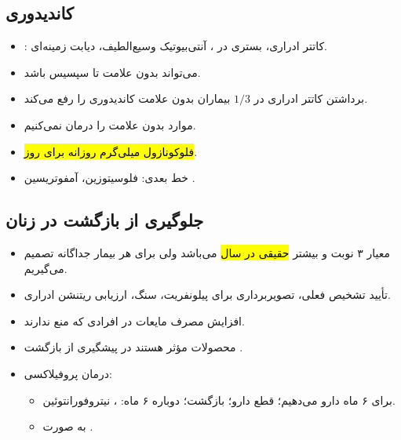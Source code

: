 \subsection*{کاندیدوری}
\begin{itemize}
\item {}: کاتتر ادراری، بستری در ، آنتی‌بیوتیک وسیع‌الطیف، دیابت زمینه‌ای.
\item می‌تواند بدون علامت تا سپسیس باشد.
\item برداشتن کاتتر ادراری در $1/3$ بیماران بدون علامت کاندیدوری را رفع می‌کند.
\item موارد بدون علامت را درمان نمی‌کنیم.
\item \hl{فلوکونازول  میلی‌گرم روزانه برای  روز}.
\item خط بعدی: فلوسیتوزین، آمفوتریسین .
\end{itemize}

\subsection*{جلوگیری از بازگشت  در زنان}
\begin{itemize}
\item معیار ۳ نوبت و بیشتر \hl{ حقیقی در سال} می‌باشد ولی برای هر بیمار جداگانه تصمیم می‌گیریم.
\item تأیید تشخیص  فعلی، تصویربرداری برای پیلونفریت، سنگ، ارزیابی ریتنشن ادراری.
\item افزایش مصرف مایعات در افرادی که منع ندارند.
\item محصولات  مؤثر هستند در پیشگیری از بازگشت .
\item درمان  پروفیلاکسی:
\begin{itemize}
\item برای ۶ ماه دارو می‌دهیم؛ قطع دارو؛ بازگشت؛ دوباره ۶ ماه: ، نیتروفورانتوئین.
\item {} به صورت .
\end{itemize}
\end{itemize}
